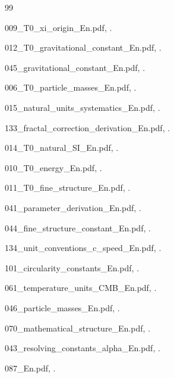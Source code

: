 	\begin{thebibliography}{99}
		
		009\_T0\_xi\_origin\_En.pdf, .
		
		012\_T0\_gravitational\_constant\_En.pdf, .
		
		045\_gravitational\_constant\_En.pdf, .
		
		006\_T0\_particle\_masses\_En.pdf, .
		
		015\_natural\_units\_systematics\_En.pdf, .
		
		133\_fractal\_correction\_derivation\_En.pdf, .
		
		014\_T0\_natural\_SI\_En.pdf, .
		
		010\_T0\_energy\_En.pdf, .
		
		011\_T0\_fine\_structure\_En.pdf, .
		
		041\_parameter\_derivation\_En.pdf, .
		
		044\_fine\_structure\_constant\_En.pdf, .
		
		134\_unit\_conventions\_c\_speed\_En.pdf, .
		
		101\_circularity\_constants\_En.pdf, .
		
		061\_temperature\_units\_CMB\_En.pdf, .
		
		046\_particle\_masses\_En.pdf, .
		
		070\_mathematical\_structure\_En.pdf, .
		
		043\_resolving\_constants\_alpha\_En.pdf, .
		
		087\_En.pdf, .
		
	\end{thebibliography}
	